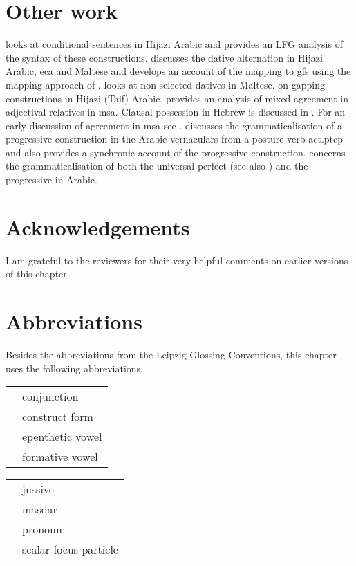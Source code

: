 \documentclass[output=paper,hidelinks]{langscibook}
\begin{document}
\section{Other work}

\citet{Alotaibi14Conditional} looks at  conditional sentences in Hijazi Arabic and provides an LFG analysis of the syntax of these constructions.  \citet{ACTA:dat} discusses the  dative alternation in Hijazi Arabic, {\sc eca} and Maltese and develops an  account of the mapping to {\sc gf}s using the mapping approach of \citet{Kibort:08}. \citet{CamSad:LFG12} looks at non-selected datives in Maltese.  \citet{Alzaidi:2010} on gapping constructions in Hijazi (Taif) Arabic.  \citet{Sadler:NomMod} provides an analysis of  mixed agreement in adjectival relatives in {\sc msa}.  Clausal possession in Hebrew is discussed in  \citet{Falk04}.
For an early discussion of agreement in {\sc msa} see \citet{FF}.  \citet{camilleri-sadler-2:2017} discusses the grammaticalisation of a progressive construction in the Arabic vernaculars from a posture verb {\sc act.ptcp}  and also provides a synchronic account of the progressive construction.
\citet{CamilleriSadler:LFG2018}  concerns the grammaticalisation of both the  universal perfect (see also \citealt{Camilleri:PhD16})  and the progressive in Arabic.



\section*{Acknowledgements}
I am grateful to the reviewers  for their very helpful comments on earlier versions of  this chapter.

\section*{Abbreviations}

Besides the abbreviations from the Leipzig Glossing Conventions, this
chapter uses the following abbreviations.\medskip

\noindent\begin{tabularx}{.45\textwidth}{lQ}
 & conjunction\\
 & construct form \\
 & epenthetic vowel \\
 & formative vowel \\
\end{tabularx}
\noindent\begin{tabularx}{.45\textwidth}{lQ}
 & jussive\\
 & maṣdar \\
 & pronoun \\
 & scalar focus particle \\
\end{tabularx}


{\sloppy\printbibliography[heading=subbibliography,notkeyword=this]}
\end{document}
